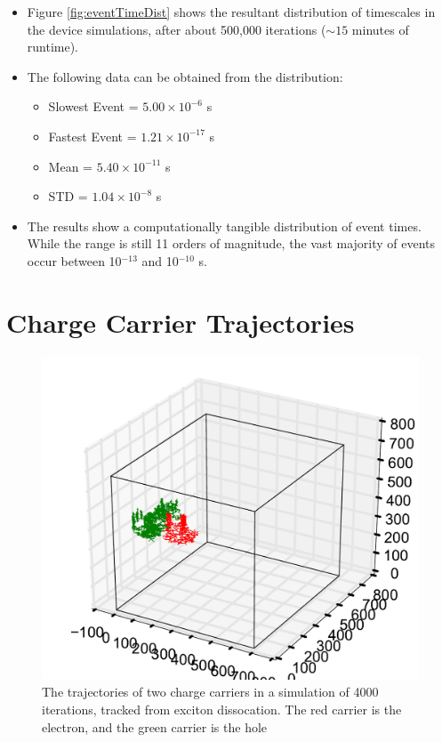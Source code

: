 \documentclass[12pt]{article}
\begin{document}
\begin{itemize}
    \item{Figure \ref{fig:eventTimeDist} shows the resultant distribution of timescales in the device simulations, after about 500,000 iterations ($\sim 15$ minutes of runtime).}
    \item{The following data can be obtained from the distribution:
        \begin{itemize}
            \item{Slowest Event = $5.00 \times 10^{-6}$ s}
            \item{Fastest Event = $1.21 \times 10^{-17}$ s}
            \item{Mean = $5.40 \times 10^{-11}$ s}
            \item{STD = $1.04 \times 10^{-8}$ s}
        \end{itemize}
    }
\item{The results show a computationally tangible distribution of event times. While the range is still 11 orders of magnitude, the vast majority of events occur between 10$^{-13}$ and 10$^{-10}$ s.}
\end{itemize}

\clearpage
\section{Charge Carrier Trajectories}

\begin{figure}[h!]\centering
	\includegraphics[width=\textwidth]{Figures/3d_trajectory.pdf}
    \caption{The trajectories of two charge carriers in a simulation of 4000 iterations, tracked from exciton dissocation. The red carrier is the electron, and the green carrier is the hole}
	\label{fig:3dTrajectory}
\end{figure}
\end{document}
